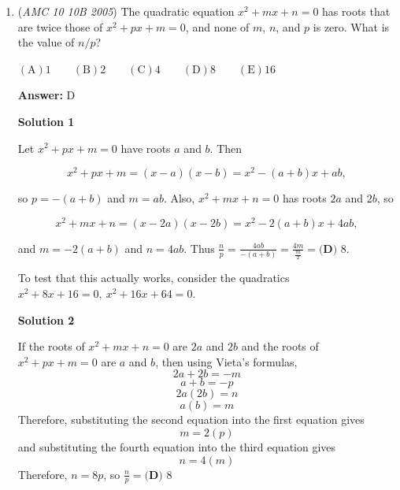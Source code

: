 \begin{enumerate}
We see that there are $2$ of each bill. We can simplify the question to only drawing $1$ bill out of $4$, and trying to draw $\$ 10$. (Originally you need to draw $\$ 20$, but the bill is halved, so you need to draw only $\$ 10$.) We see that we have $1$ of each bill $\$1$, $\$5$, $\$10$, and $\$20$.Thus, we can easily see the solution is $\boxed{(D) \frac{1}{2}}$.

 



\textbf{Solution 6 (Quick and simple)}

We see that either we draw two different types of bills or two of the same. If we draw two different types of bills, there are simply $\binom{4}{2}$ ways and $4$ ways if we have two of the same. Counting up the possibilities where it is more than 20, namely being:
 \[1, 20\]
 \[5, 20\]
 \[10, 10\]
 \[10, 20\]and finally, 20, 20. Now, we see that we have five possibilities out of 10, which gives us the answer $\boxed{(D) \frac{1}{2}}$.

 


	\item (\textit{AMC 10 10B 2005}) The quadratic equation $x^2 + mx + n = 0$ has roots that are twice those of $x^2 + px + m = 0$, and none of $m$, $n$, and $p$ is zero. What is the value of $n/p$?


 $\mathrm{(A)} 1 \qquad \mathrm{(B)} 2 \qquad \mathrm{(C)} 4 \qquad \mathrm{(D)} 8 \qquad \mathrm{(E)} 16$

 \textbf{Answer: }D



\textbf{Solution 1}

Let $x^2 + px + m = 0$ have roots $a$ and $b$. Then 

 
 \[x^2 + px + m = (x-a)(x-b) = x^2 - (a+b)x + ab,\]

 so $p = -(a+b)$ and $m = ab$. Also, $x^2 + mx + n = 0$ has roots $2a$ and $2b$, so

 
 \[x^2 + mx + n = (x-2a)(x-2b) = x^2 - 2(a+b)x + 4ab,\]

 and $m = -2(a+b)$ and $n = 4ab$. Thus $\frac{n}{p} = \frac{4ab}{-(a+b)} = \frac{4m}{\frac{m}{2}} = \boxed{\textbf{(D) }8}$. 

 To test that this actually works, consider the quadratics $x^2 + 8x + 16 = 0,\ x^2 + 16x + 64 = 0$.

 



\textbf{Solution 2}

If the roots of $x^2 + mx + n = 0$ are $2a$ and $2b$ and the roots of $x^2 + px + m = 0$ are $a$ and $b$, then using Vieta's formulas,
 \[2a + 2b = -m\]
 \[a + b = -p\]
 \[2a(2b) = n\]
 \[a(b) = m\]Therefore, substituting the second equation into the first equation gives 
 \[m = 2(p)\]and substituting the fourth equation into the third equation gives
 \[n = 4(m)\]Therefore, $n = 8p$, so $\frac{n}{p}= \boxed{\textbf{(D) }8}$




\end{enumerate}
